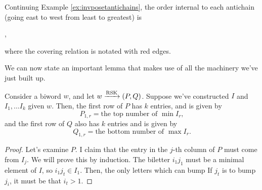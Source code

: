 \documentclass{article}
\DeclareMathOperator{\RSK}{RSK}
\newcommand{\rskarrow}{\ensuremath\xrightarrow{\RSK}}
\begin{document}
\begin{example}
    Continuing Example \ref{ex:invposetantichains}, the order internal to each antichain (going east to west from least to greatest) is
    \begin{center}
        ,
    \end{center}
    where the covering relation is notated with red edges.
\end{example}

We can now state an important lemma that makes use of all the machinery we've just built up.

\begin{lemma}\label{lem:invposetfirstrowrsk}
    Consider a biword $w$, and let $w \rskarrow (P, Q)$.
    Suppose we've constructed $I$ and $I_1, \ldots I_k$ given $w$.
    Then, the first row of $P$ has $k$ entries, and is given by
    \[
        P_{1,r} = \text{the top number of }\min I_r,
    \]
    and the first row of $Q$ also has $k$ entries and is given by
    \[
        Q_{1,r} = \text{the bottom number of }\max I_r.
    \]
\end{lemma}

\begin{proof}
    Let's examine $P$.
    I claim that the entry in the $j$-th column of $P$ must come from $I_j$.
    We will prove this by induction.
    The biletter $i_1j_1$ must be a minimal element of $I$, so $i_1j_t \in I_1$.
    Then, the only letters which can bump 
    If $j_t$ is to bump $j_i$, it must be that $i_t > 1$.
\end{proof}
\end{document}
